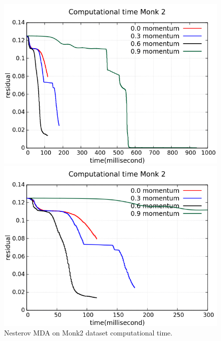 \begin{figure}[H]
	\centering
	\begin{minipage}[t]{0.5\linewidth}
		\includegraphics[width=\linewidth]{data/MGD/Monk2/NM/Monk2_NMGD_CT_standard.png}
	\end{minipage}%
	\begin{minipage}[t]{0.5\linewidth}
		\includegraphics[width=\linewidth]{data/MGD/Monk2/NM/Monk2_NMGD_CT_zoom.png}
	\end{minipage}
	\caption{Nesterov MDA on Monk2 dataset computational time.}
\end{figure}
